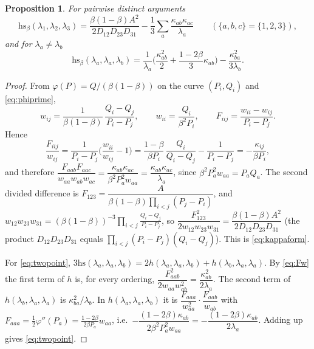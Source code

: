 \documentclass[11pt]{amsart}
\newtheorem{proposition}[theorem]{Proposition}
\theoremstyle{definition}
\numberwithin{equation}{section}
\newcommand{\hs}{\mathrm{hs}}
\begin{document}
\begin{proposition}\label{prop:kappa}
For pairwise distinct arguments
\begin{equation}\label{eq:kappaform}
\hs_\beta(\lambda_1,\lambda_2,\lambda_3)=\frac{\beta(1-\beta)A^2}{2D_{12}D_{23}D_{31}}-\frac13\sum_{a}\frac{\kappa_{ab}\kappa_{ac}}{\lambda_a}\qquad(\{a,b,c\}=\{1,2,3\}),
\end{equation}
and for $\lambda_a\neq\lambda_b$
\begin{equation}\label{eq:twopoint}
\hs_\beta(\lambda_a,\lambda_a,\lambda_b)=\frac1{\lambda_a}\Big(\frac{\kappa_{ab}^2}2+\frac{1-2\beta}3\kappa_{ab}\Big)-\frac{\kappa_{ba}^2}{3\lambda_b}.
\end{equation}
\end{proposition}
\begin{proof}
From $\varphi(P)=Q/(\beta(1-\beta))$ on the curve $(P_i,Q_i)$ and \eqref{eq:phiprime},
\[w_{ij}=\frac{1}{\beta(1-\beta)}\,\frac{Q_i-Q_j}{P_i-P_j},\qquad w_{ii}=\frac{Q_i}{\beta^2P_i},\qquad F_{iij}=\frac{w_{ii}-w_{ij}}{P_i-P_j}.\]
Hence
\begin{equation}\label{eq:Fw}
\frac{F_{iij}}{w_{ij}}=\frac1{P_i-P_j}\Big(\frac{w_{ii}}{w_{ij}}-1\Big)=\frac{1-\beta}{\beta P_i}\,\frac{Q_i}{Q_i-Q_j}-\frac1{P_i-P_j}=-\frac{\kappa_{ij}}{\beta P_i},
\end{equation}
and therefore $\dfrac{F_{aab}F_{aac}}{w_{aa}w_{ab}w_{ac}}=\dfrac{\kappa_{ab}\kappa_{ac}}{\beta^2P_a^2w_{aa}}=\dfrac{\kappa_{ab}\kappa_{ac}}{\lambda_a}$, since $\beta^2P_a^2w_{aa}=P_aQ_a$. The second divided difference is
$F_{123}=\dfrac{A}{\beta(1-\beta)\prod_{i<j}(P_j-P_i)}$, and $w_{12}w_{23}w_{31}=(\beta(1-\beta))^{-3}\prod_{i<j}\frac{Q_i-Q_j}{P_i-P_j}$, so
$\dfrac{F_{123}^2}{2w_{12}w_{23}w_{31}}=\dfrac{\beta(1-\beta)A^2}{2D_{12}D_{23}D_{31}}$ (the product $D_{12}D_{23}D_{31}$ equals $\prod_{i<j}(P_i-P_j)(Q_i-Q_j)$). This is \eqref{eq:kappaform}.

For \eqref{eq:twopoint}, $3\hs(\lambda_a,\lambda_a,\lambda_b)=2h(\lambda_a,\lambda_a,\lambda_b)+h(\lambda_b,\lambda_a,\lambda_a)$. By \eqref{eq:Fw} the first term of $h$ is, for every ordering,
$\dfrac{F_{aab}^2}{2w_{aa}w_{ab}^2}=\dfrac{\kappa_{ab}^2}{2\lambda_a}$. The second term of $h(\lambda_b,\lambda_a,\lambda_a)$ is $\kappa_{ba}^2/\lambda_b$. In $h(\lambda_a,\lambda_a,\lambda_b)$ it is
$\dfrac{F_{aaa}}{w_{aa}^2}\cdot\dfrac{F_{aab}}{w_{ab}}$ with $F_{aaa}=\frac12\varphi''(P_a)=\frac{1-2\beta}{2\beta P_a}w_{aa}$, i.e.\
$-\dfrac{(1-2\beta)\kappa_{ab}}{2\beta^2P_a^2w_{aa}}=-\dfrac{(1-2\beta)\kappa_{ab}}{2\lambda_a}$. Adding up gives \eqref{eq:twopoint}.
\end{proof}
\end{document}
